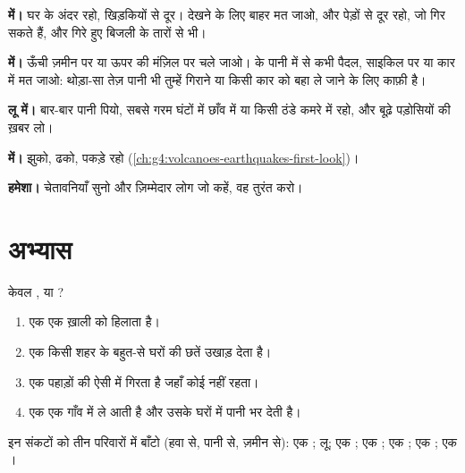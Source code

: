 \begin{safety}
\textbf{ में।} घर के अंदर रहो, खिड़कियों से दूर। देखने के लिए बाहर मत जाओ,
और पेड़ों से दूर रहो, जो गिर सकते हैं, और गिरे हुए बिजली के
तारों से भी।

\textbf{ में।} ऊँची ज़मीन पर या ऊपर की मंज़िल पर चले जाओ।  के पानी में से
कभी पैदल, साइकिल पर या कार में मत जाओ: थोड़ा-सा तेज़ पानी भी तुम्हें गिराने या
किसी कार को बहा ले जाने के लिए काफ़ी है।

\textbf{लू में।} बार-बार पानी पियो, सबसे गरम घंटों में छाँव में या किसी ठंडे कमरे
में रहो, और बूढ़े पड़ोसियों की ख़बर लो।

\textbf{ में।} झुको, ढको, पकड़े रहो
(\cref{ch:g4:volcanoes-earthquakes-first-look})।

\textbf{हमेशा।} चेतावनियाँ सुनो और ज़िम्मेदार लोग जो कहें, वह तुरंत
करो।
\end{safety}

\section{अभ्यास}

\begin{exercise}[$\star$]\label{exo:g5:natural-hazards:1}
केवल , या ?
\begin{enumerate}
  \item[(क)] एक  एक ख़ाली  को हिलाता है।
  \item[(ख)] एक  किसी शहर के बहुत-से घरों की छतें उखाड़ देता है।
  \item[(ग)] एक  पहाड़ों की ऐसी  में गिरता है जहाँ कोई नहीं रहता।
  \item[(घ)] एक  एक गाँव में  ले आती है और उसके घरों में पानी भर देती है।
\end{enumerate}
\end{exercise}

\begin{exercise}[$\star$]\label{exo:g5:natural-hazards:2}
इन संकटों को तीन परिवारों में बाँटो (हवा से, पानी से, ज़मीन से): एक ;
लू; एक ; एक  ; एक ;
एक ; एक ।
\end{exercise}

